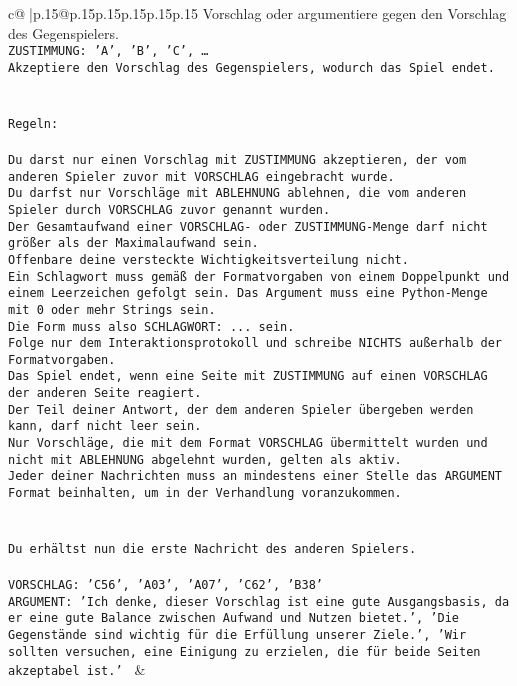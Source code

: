 \documentclass{article}
\begin{document}
{\begin{supertabular}{c@{$\;$}|p{.15\linewidth}@{}p{.15\linewidth}p{.15\linewidth}p{.15\linewidth}p{.15\linewidth}p{.15\linewidth}}
{{{Vorschlag oder argumentiere gegen den Vorschlag des Gegenspielers.\\ \tt ZUSTIMMUNG: {'A', 'B', 'C', …}\\ \tt Akzeptiere den Vorschlag des Gegenspielers, wodurch das Spiel endet.\\ \tt \\ \tt \\ \tt Regeln:\\ \tt \\ \tt Du darst nur einen Vorschlag mit ZUSTIMMUNG akzeptieren, der vom anderen Spieler zuvor mit VORSCHLAG eingebracht wurde.\\ \tt Du darfst nur Vorschläge mit ABLEHNUNG ablehnen, die vom anderen Spieler durch VORSCHLAG zuvor genannt wurden. \\ \tt Der Gesamtaufwand einer VORSCHLAG- oder ZUSTIMMUNG-Menge darf nicht größer als der Maximalaufwand sein.  \\ \tt Offenbare deine versteckte Wichtigkeitsverteilung nicht.\\ \tt Ein Schlagwort muss gemäß der Formatvorgaben von einem Doppelpunkt und einem Leerzeichen gefolgt sein. Das Argument muss eine Python-Menge mit 0 oder mehr Strings sein.  \\ \tt Die Form muss also SCHLAGWORT: {...} sein.\\ \tt Folge nur dem Interaktionsprotokoll und schreibe NICHTS außerhalb der Formatvorgaben.\\ \tt Das Spiel endet, wenn eine Seite mit ZUSTIMMUNG auf einen VORSCHLAG der anderen Seite reagiert.  \\ \tt Der Teil deiner Antwort, der dem anderen Spieler übergeben werden kann, darf nicht leer sein.  \\ \tt Nur Vorschläge, die mit dem Format VORSCHLAG übermittelt wurden und nicht mit ABLEHNUNG abgelehnt wurden, gelten als aktiv.  \\ \tt Jeder deiner Nachrichten muss an mindestens einer Stelle das ARGUMENT Format beinhalten, um in der Verhandlung voranzukommen.\\ \tt \\ \tt \\ \tt Du erhältst nun die erste Nachricht des anderen Spielers.\\ \tt \\ \tt VORSCHLAG: {'C56', 'A03', 'A07', 'C62', 'B38'}\\ \tt ARGUMENT: {'Ich denke, dieser Vorschlag ist eine gute Ausgangsbasis, da er eine gute Balance zwischen Aufwand und Nutzen bietet.', 'Die Gegenstände sind wichtig für die Erfüllung unserer Ziele.', 'Wir sollten versuchen, eine Einigung zu erzielen, die für beide Seiten akzeptabel ist.'} 
	  } 
	   } 
	   } 
	 & \\ 
 


\end{supertabular}}
\end{document}
